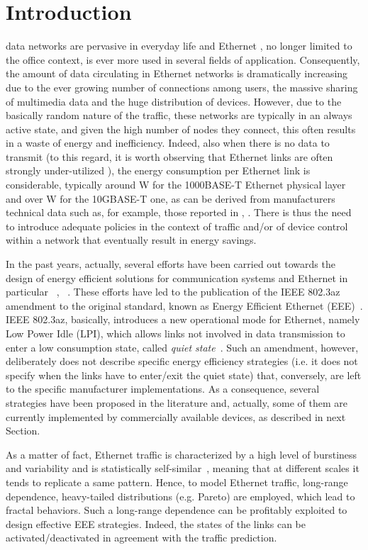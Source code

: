 \documentclass[journal,10pt,twoside,final]{IEEEtran}
\begin{document}
\section{Introduction}
\label{intro}
 data networks are pervasive in everyday life and Ethernet \cite{ether}, no longer limited to the office context, is ever more used in several fields of application. Consequently, the amount of data circulating in Ethernet networks is dramatically increasing due to the ever growing number of connections among users, the massive sharing of multimedia data and the huge distribution of devices.
However, due to the basically random nature of the traffic, these networks are typically in an always active state, and given the high number of nodes they connect, this often results in a waste of energy and inefficiency. Indeed, also when there is no data to transmit (to this regard, it is worth observing that Ethernet links are often strongly under-utilized \cite{bolla_jsac}), the energy consumption per Ethernet link is considerable, typically around  W for the 1000BASE-T Ethernet physical layer and over  W for the 10GBASE-T one, as can be derived from manufacturers technical data such as, for example, those reported in \cite{cisco}, \cite{intel}. There is thus the need to introduce adequate policies in the context of traffic and/or of device control within a network that eventually result in energy savings.

In the past years, actually, several efforts have been carried out towards the design of energy efficient solutions for communication systems and Ethernet in particular ~\cite{GuptaSingh03}, ~\cite{GunaratneChristensenNordman08}.
These efforts have led to the publication of the IEEE 802.3az amendment to the original standard, known as Energy Efficient Ethernet (EEE)~\cite{eee}. IEEE 802.3az, basically, introduces a new operational mode for Ethernet, namely Low Power Idle (LPI), which allows links not involved in data transmission to enter a low consumption state, called \emph{quiet state}~\cite{ChristensenReviriegoNordman10}. Such an amendment, however, deliberately does not describe specific energy efficiency strategies (i.e. it does not specify when the links have to enter/exit the quiet state) that, conversely, are left to the specific manufacturer implementations. As a consequence, several strategies have been proposed in the literature and, actually, some of them are currently implemented by commercially available devices, as described in next Section. 

As a matter of fact, Ethernet traffic is characterized by a high level of burstiness and variability and is statistically self-similar~\cite{LelandTaqquWillinger94}, meaning that at different scales it tends to replicate a same pattern. 
Hence, to model Ethernet traffic, long-range dependence, heavy-tailed distributions (e.g. Pareto) are employed, which lead to fractal behaviors.
Such a long-range dependence can be profitably exploited to design effective EEE strategies. Indeed, the states of the links can be activated/deactivated in agreement with the traffic prediction. 
\end{document}
